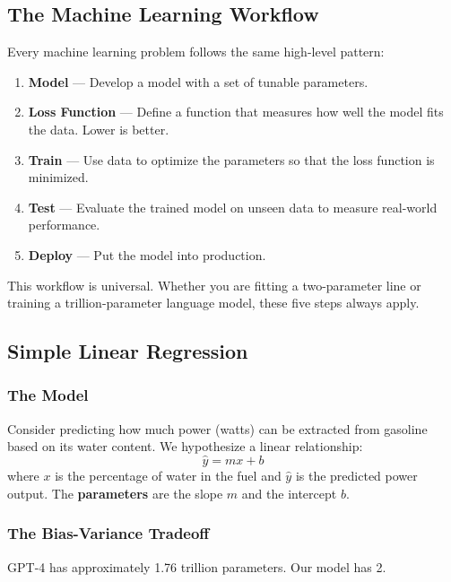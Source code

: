 \documentclass[11pt]{article}
\begin{document}
\subsection{The Machine Learning Workflow}

Every machine learning problem follows the same high-level pattern:
\begin{enumerate}
  \item \textbf{Model} --- Develop a model with a set of tunable parameters.
  \item \textbf{Loss Function} --- Define a function that measures how well the model fits the data. Lower is better.
  \item \textbf{Train} --- Use data to optimize the parameters so that the loss function is minimized.
  \item \textbf{Test} --- Evaluate the trained model on unseen data to measure real-world performance.
  \item \textbf{Deploy} --- Put the model into production.
\end{enumerate}

\begin{notebox}
This workflow is universal. Whether you are fitting a two-parameter line or training a trillion-parameter language model, these five steps always apply.
\end{notebox}

\subsection{Simple Linear Regression}

\subsubsection{The Model}

Consider predicting how much power (watts) can be extracted from gasoline based on its water content. We hypothesize a linear relationship:
\[
\hat{y} = mx + b
\]
where $x$ is the percentage of water in the fuel and $\hat{y}$ is the predicted power output. The \textbf{parameters} are the slope $m$ and the intercept $b$.

\subsubsection{The Bias-Variance Tradeoff}

\begin{notebox}
GPT-4 has approximately 1.76 trillion parameters. Our model has 2.
\end{notebox}
\end{document}
